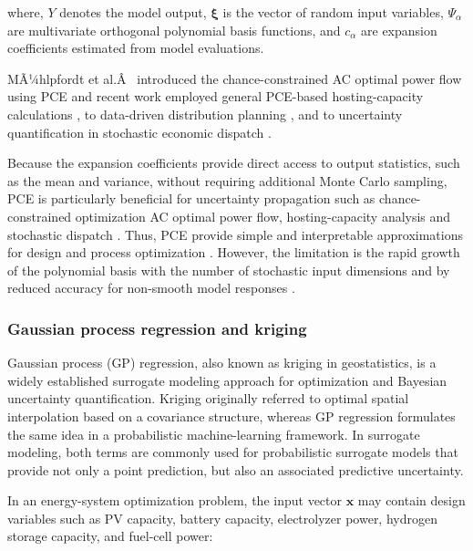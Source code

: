 \documentclass[final,5p,times,twocolumn]{elsarticle}
\begin{document}
where, $Y$ denotes the model output, $\boldsymbol{\xi}$ is the vector of
random input variables, $\Psi_{\alpha}$ are multivariate orthogonal
polynomial basis functions, and $c_{\alpha}$ are expansion coefficients
estimated from model evaluations.

MÃ¼hlpfordt et al.Â~\cite{Muhlpfordt20194806} introduced the
chance-constrained AC optimal power flow using PCE and recent work
employed general PCE-based hosting-capacity calculations
\cite{Koirala20242284}, to data-driven distribution planning
\cite{Fu20202904,Fu2022}, and to uncertainty quantification in stochastic
economic dispatch \cite{Safta20172535}.

Because the expansion coefficients provide direct access to output
statistics, such as the mean and variance, without requiring additional
Monte Carlo sampling, PCE is particularly beneficial for uncertainty
propagation such as chance-constrained optimization AC optimal power
flow, hosting-capacity analysis and stochastic dispatch
\cite{Muhlpfordt20194806,Safta20172535,Xu20212696,Koirala20242284}.
Thus, PCE provide simple and interpretable approximations for design and
process optimization
\cite{Hasanien2018168,Sami20181416,Ahmad202451}.
However, the limitation is the rapid growth of the polynomial basis with
the number of stochastic input dimensions and by reduced accuracy for
non-smooth model responses
\cite{Muhlpfordt20194806,Safta20172535,Koirala20242284,Xu20212696}.

\subsubsection{Gaussian process regression and kriging}
\label{sec:tax:gp}

Gaussian process (GP) regression, also known as kriging in
geostatistics, is a widely established surrogate modeling approach for
optimization and Bayesian uncertainty quantification. Kriging originally
referred to optimal spatial interpolation based on a covariance
structure, whereas GP regression formulates the same idea in a
probabilistic machine-learning framework. In surrogate modeling, both
terms are commonly used for probabilistic surrogate models that provide
not only a point prediction, but also an associated predictive
uncertainty.

In an energy-system optimization problem, the input vector $\mathbf{x}$
may contain design variables such as PV capacity, battery capacity,
electrolyzer power, hydrogen storage capacity, and fuel-cell power:
\end{document}
